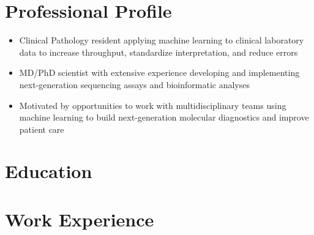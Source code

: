 \documentclass[11pt,a4paper,]{moderncv}
\begin{document}
\makecvtitle



\hypertarget{professional-profile}{%
\section{Professional Profile}\label{professional-profile}}

\begin{itemize}[leftmargin = 3 cm]
  \item Clinical Pathology resident applying machine learning to
    clinical laboratory data to increase throughput, standardize 
    interpretation, and reduce errors

  \item MD/PhD scientist with extensive experience developing
    and implementing next-generation sequencing assays and
    bioinformatic analyses

  \item Motivated by opportunities to work with
    multidisciplinary teams using machine learning to build
    next-generation molecular diagnostics and improve patient 
    care

\end{itemize}

\vspace{0 pt}

\hypertarget{education}{%
\section{Education}\label{education}}

\nopagebreak

\hypertarget{work-experience}{%
\section{Work Experience}\label{work-experience}}
\end{document}
